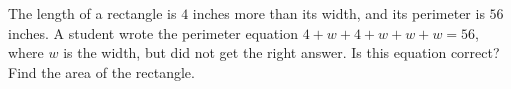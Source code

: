 The length of a rectangle is $4$ inches more than its width, and its perimeter is $56$ inches. A student wrote the perimeter equation $4+w+4+w+w+w=56$, where $w$ is the width, but did not get the right answer. Is this equation correct? Find the area of the rectangle.
